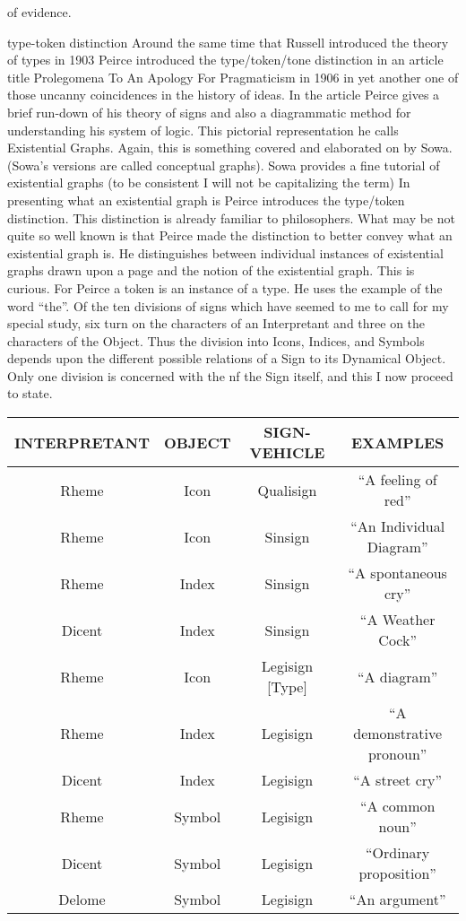 \documentclass[dah,phd,a4paper]{xe_uccthesis}
\begin{document}
of evidence.

type-token distinction
Around the same time that Russell introduced the theory of types in 1903 Peirce introduced the type/token/tone distinction in an article title Prolegomena To An Apology For Pragmaticism\citep{peirce_prolegomena_1906} in 1906 in yet another one of those uncanny coincidences in the history of ideas.
In the article Peirce gives a brief run-down of his theory of signs and also a diagrammatic method for understanding his system of logic. This pictorial representation he calls Existential Graphs. Again, this is something covered and elaborated on by Sowa. (Sowa's versions are called conceptual graphs). Sowa provides a fine tutorial\citep{sowa_peirces_2015} of existential graphs (to be consistent I will not be capitalizing the term)
In presenting what an existential graph is Peirce introduces the type/token distinction. This distinction is already familiar to philosophers. What may be not quite so well known is that Peirce made the distinction to better convey what an existential graph is. He distinguishes between individual instances of existential graphs drawn upon a page and the notion of the existential graph. This is curious. For Peirce a token is an instance of a type. He uses the example of the word “the”. 
Of the ten divisions of signs which have seemed to me to call for my special study, six turn on the characters of an Interpretant and three on the characters of the Object. Thus the division into Icons, Indices, and Symbols depends upon the different possible relations of a Sign to its Dynamical Object. Only one division is concerned with the nf the Sign itself, and this I now proceed to state.

\begin{tabular}{|c|c|c|c|}
\hline 
INTERPRETANT & OBJECT & SIGN-VEHICLE    & EXAMPLES \\ 
\hline 
Rheme        & Icon   & Qualisign       & “A feeling of red” \\ 
\hline 
Rheme        & Icon   & Sinsign         & “An Individual Diagram” \\ 
\hline 
Rheme        & Index  & Sinsign         & “A spontaneous cry” \\ 
\hline 
Dicent       & Index  & Sinsign         & “A Weather Cock” \\ 
\hline 
Rheme        & Icon   & Legisign [Type] & “A diagram” \\ 
\hline 
Rheme        & Index  & Legisign        & “A demonstrative pronoun” \\ 
\hline 
Dicent       & Index  & Legisign        & “A street cry” \\ 
\hline 
Rheme        & Symbol & Legisign        & “A common noun” \\ 
\hline 
Dicent       & Symbol & Legisign        & “Ordinary proposition” \\ 
\hline 
Delome       & Symbol & Legisign        & “An argument” \\ 
\hline 
\end{tabular}
\begin{flushright}
\citep[pp. 254—263]{Peirce_CP_vol_II_1932}
\end{flushright}
\end{document}
